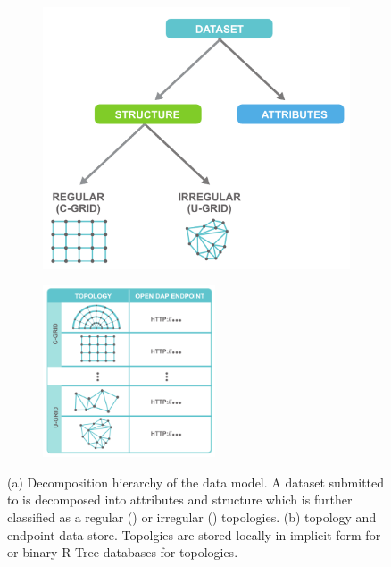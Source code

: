 \begin{figure}[ht!]
  \centering
  \begin{subfigure}[t]{0.45\textwidth}
    \includegraphics[width=\textwidth]{../figs/data_model_hierarchy}
    \caption{}
    \label{fig:data_hierarchy}
  \end{subfigure}
  \begin{subfigure}[t]{0.45\textwidth}
    \includegraphics[height=2in]{../figs/sciwms_book_db_topology_endpoint_chart}
    \caption{}
    \label{fig:sciwms_topology_endpoints}
  \end{subfigure}
  \caption{(a) Decomposition hierarchy of the data model. A dataset
    submitted to \sciwms{} is decomposed into attributes and structure
    which is further classified as a regular (\cgrid{}) or irregular
    (\ugrid{}) topologies. (b) \Sciwms{} topology and endpoint data
    store. Topolgies are stored locally in implicit form for \cgrid{}
    or binary R-Tree databases for \ugrid{} topologies. }
\end{figure}

